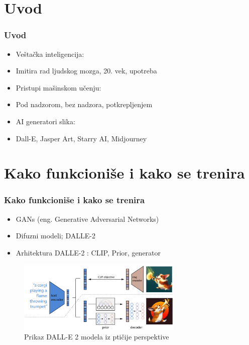 \documentclass{beamer}
\begin{document}
\section{Uvod} %

\begin{frame}[fragile]\frametitle{Uvod}

\begin{itemize}
	\item Veštačka inteligencija:
	\item[] Imitira rad ljudskog mozga, 20. vek, upotreba
	\item Pristupi mašinskom učenju:
	\item[] Pod nadzorom, bez nadzora, potkrepljenjem
	\item AI generatori slika:
	\item[] Dall-E, Jasper Art, Starry AI, Midjourney
\end{itemize}
	
\end{frame}

\section{Kako funkcioniše i kako se trenira}

\begin{frame}[fragile]\frametitle{Kako funkcioniše i kako se trenira}

\begin{itemize}
	\item GANs (eng. Generative Adversarial Networks)
	\item Difuzni modeli; DALLE-2
	\item Arhitektura DALLE-2 : CLIP, Prior, generator
\end{itemize}

\begin{figure}[htp]
\centering
\includegraphics[width=0.7\textwidth]{dalle2.eps}
\caption{Prikaz DALL-E 2 modela iz ptičije perspektive}
\label{fig: dalle2slika}
\end{figure}

\end{frame}
\end{document}
